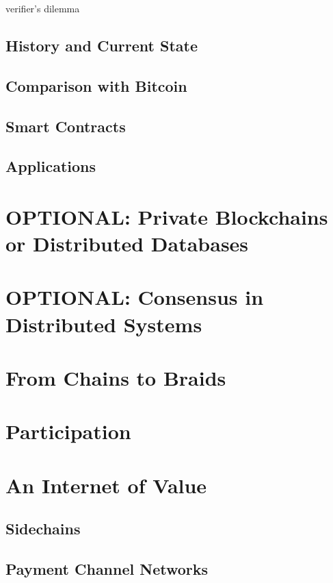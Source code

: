 \cite{Luu:2015:DIC:2810103.2813659} verifier's dilemma

\subsection{History and Current State}

\subsection{Comparison with Bitcoin}

\subsection{Smart Contracts}

\subsection{Applications}

\section{OPTIONAL: Private Blockchains or Distributed Databases}

\section{OPTIONAL: Consensus in Distributed Systems}

\section{From Chains to Braids}

\section{Participation}

\section{An Internet of Value}

\subsection{Sidechains}
\subsection{Payment Channel Networks}
